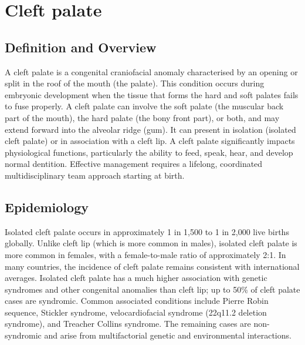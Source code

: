 \chapter{Cleft palate}

\section*{Definition and Overview}
A cleft palate is a congenital craniofacial anomaly characterised by an opening or split in the roof of the mouth (the palate). This condition occurs during embryonic development when the tissue that forms the hard and soft palates fails to fuse properly. A cleft palate can involve the soft palate (the muscular back part of the mouth), the hard palate (the bony front part), or both, and may extend forward into the alveolar ridge (gum). It can present in isolation (isolated cleft palate) or in association with a cleft lip. A cleft palate significantly impacts physiological functions, particularly the ability to feed, speak, hear, and develop normal dentition. Effective management requires a lifelong, coordinated multidisciplinary team approach starting at birth.

\section*{Epidemiology}
Isolated cleft palate occurs in approximately 1 in 1,500 to 1 in 2,000 live births globally. Unlike cleft lip (which is more common in males), isolated cleft palate is more common in females, with a female-to-male ratio of approximately 2:1. In many countries, the incidence of cleft palate remains consistent with international averages. Isolated cleft palate has a much higher association with genetic syndromes and other congenital anomalies than cleft lip; up to 50\% of cleft palate cases are syndromic. Common associated conditions include Pierre Robin sequence, Stickler syndrome, velocardiofacial syndrome (22q11.2 deletion syndrome), and Treacher Collins syndrome. The remaining cases are non-syndromic and arise from multifactorial genetic and environmental interactions.

